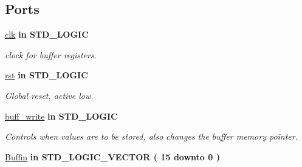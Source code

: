 \subsection*{Ports}
 \begin{DoxyCompactItemize}
\item 
\hypertarget{classADC__buffer_a8120037e0ee47c35ba2d79242209c72e}{\hyperlink{classADC__buffer_a8120037e0ee47c35ba2d79242209c72e}{clk}  {\bfseries {\bfseries \textcolor{vhdlkeyword}{in}\textcolor{vhdlchar}{ }}} {\bfseries \textcolor{comment}{S\-T\-D\-\_\-\-L\-O\-G\-I\-C}\textcolor{vhdlchar}{ }} }\label{classADC__buffer_a8120037e0ee47c35ba2d79242209c72e}

\begin{DoxyCompactList}\small\item\em clock for buffer registers. \end{DoxyCompactList}\item 
\hypertarget{classADC__buffer_aa7b7040844189161771c36cf6bbf172c}{\hyperlink{classADC__buffer_aa7b7040844189161771c36cf6bbf172c}{rst}  {\bfseries {\bfseries \textcolor{vhdlkeyword}{in}\textcolor{vhdlchar}{ }}} {\bfseries \textcolor{comment}{S\-T\-D\-\_\-\-L\-O\-G\-I\-C}\textcolor{vhdlchar}{ }} }\label{classADC__buffer_aa7b7040844189161771c36cf6bbf172c}

\begin{DoxyCompactList}\small\item\em Global reset, active low. \end{DoxyCompactList}\item 
\hypertarget{classADC__buffer_a06ea925ba19422158afb079d09e4a231}{\hyperlink{classADC__buffer_a06ea925ba19422158afb079d09e4a231}{buff\-\_\-write}  {\bfseries {\bfseries \textcolor{vhdlkeyword}{in}\textcolor{vhdlchar}{ }}} {\bfseries \textcolor{comment}{S\-T\-D\-\_\-\-L\-O\-G\-I\-C}\textcolor{vhdlchar}{ }} }\label{classADC__buffer_a06ea925ba19422158afb079d09e4a231}

\begin{DoxyCompactList}\small\item\em Controls when values are to be stored, also changes the buffer memory pointer. \end{DoxyCompactList}\item 
\hypertarget{classADC__buffer_a0edd6254bf58107fb2411cc4cab05201}{\hyperlink{classADC__buffer_a0edd6254bf58107fb2411cc4cab05201}{Buffin}  {\bfseries {\bfseries \textcolor{vhdlkeyword}{in}\textcolor{vhdlchar}{ }}} {\bfseries \textcolor{comment}{S\-T\-D\-\_\-\-L\-O\-G\-I\-C\-\_\-\-V\-E\-C\-T\-O\-R}\textcolor{vhdlchar}{ }\textcolor{vhdlchar}{(}\textcolor{vhdlchar}{ }\textcolor{vhdlchar}{ } \textcolor{vhdldigit}{15} \textcolor{vhdlchar}{ }\textcolor{vhdlchar}{ }\textcolor{vhdlchar}{ }\textcolor{vhdlkeyword}{downto}\textcolor{vhdlchar}{ }\textcolor{vhdlchar}{ }\textcolor{vhdlchar}{ } \textcolor{vhdldigit}{0} \textcolor{vhdlchar}{ }\textcolor{vhdlchar}{)}\textcolor{vhdlchar}{ }} }\label{classADC__buffer_a0edd6254bf58107fb2411cc4cab05201}


\end{DoxyCompactItemize}
